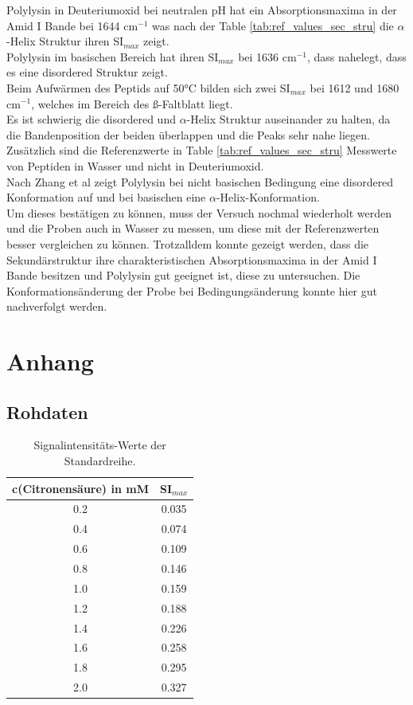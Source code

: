 \documentclass[10pt,a4paper]{article}
\begin{document}
			Polylysin in Deuteriumoxid bei neutralen pH hat ein Absorptionsmaxima in der Amid I Bande bei 1644 cm$^{-1}$ was nach der Table \ref{tab:ref_values_sec_stru} die $\alpha$-Helix Struktur ihren SI$_{max}$ zeigt.\\
			Polylysin im basischen Bereich hat ihren SI$_{max}$  bei 1636 cm$^{-1}$, dass nahelegt, dass es eine disordered Struktur zeigt.\\
			Beim Aufwärmen des Peptids auf 50°C bilden sich zwei SI$_{max}$  bei 1612 und 1680 cm$^{-1}$, welches im Bereich des ß-Faltblatt liegt.\\
			Es ist schwierig die disordered und $\alpha$-Helix Struktur auseinander zu halten, da die Bandenposition der beiden überlappen und die Peaks sehr nahe liegen. Zusätzlich sind die Referenzwerte in Table \ref{tab:ref_values_sec_stru} Messwerte von Peptiden in Wasser und nicht in  Deuteriumoxid.\\
			Nach Zhang et al\cite{Polylysin} zeigt Polylysin bei nicht basischen Bedingung eine disordered Konformation auf und bei basischen eine $\alpha$-Helix-Konformation.\\
			Um dieses bestätigen zu können, muss der Versuch nochmal wiederholt werden und die Proben auch in Wasser zu messen, um diese mit der Referenzwerten besser vergleichen zu können.
			Trotzalldem konnte gezeigt werden, dass die Sekundärstruktur ihre charakteristischen Absorptionsmaxima in der Amid I Bande besitzen und Polylysin gut geeignet ist, diese zu untersuchen.
			Die Konformationsänderung der Probe bei Bedingungsänderung konnte hier gut nachverfolgt werden.

		
	\section{Anhang}
		\subsection{Rohdaten}
		
			
			
			\begin{table}[H]
				\centering
				\caption{Signalintensitäts-Werte der Standardreihe.}
				\label{tab:r_square_standardcurve}
				\begin{tabular}{cc}
					\toprule
					c(Citronensäure) in mM & SI$_{max}$\\
					\midrule
					0.2	&0.035\\
					0.4	&0.074\\
					0.6	&0.109\\
					0.8	&0.146\\
					1.0	&0.159\\
					1.2	&0.188\\
					1.4	&0.226\\
					1.6	&0.258\\
					1.8	&0.295\\
					2.0	&0.327\\
					\bottomrule
				\end{tabular}
			\end{table}	
			
\end{document}

